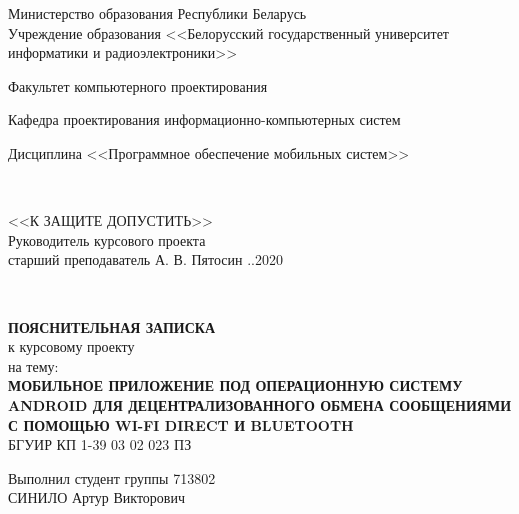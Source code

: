 
\begin{titlepage}
  \begin{center}
    Министерство образования Республики Беларусь\\
    Учреждение образования <<Белорусский государственный университет информатики и радиоэлектроники>>\\[1.15em]

    \begin{minipage}{\textwidth}
      \begin{center}
          Факультет компьютерного проектирования

          Кафедра проектирования информационно-компьютерных систем

          Дисциплина <<Программное обеспечение мобильных систем>>
      \end{center}
    \end{minipage}\\[2em]

    \begin{flushright}
      \begin{minipage}{0.5\textwidth}
	    \begin{flushleft}
          <<К ЗАЩИТЕ ДОПУСТИТЬ>>\\
          Руководитель курсового проекта\\
		  старший преподаватель
          \underline{\hspace*{2.8cm}}А. В. Пятосин
          \underline{\hspace*{2em}}.\underline{\hspace*{2em}}.2020
	    \end{flushleft}
      \end{minipage}\\[4.4em]
    \end{flushright}

	\textbf{\MakeTextUppercase{ПОЯСНИТЕЛЬНАЯ ЗАПИСКА}}\\
    {к курсовому проекту}\\
    {на тему:}\\
	\textbf{\MakeTextUppercase{Мобильное приложение под операционную систему Android для децентрализованного обмена сообщениями с помощью Wi-Fi Direct и Bluetooth}}\\[1em]

	{БГУИР КП 1-39 03 02 023 ПЗ}\\[2em]

    \begin{flushright}
      \begin{minipage}{0.5\textwidth}
        \begin{flushleft}
          Выполнил студент группы 713802\\
		  \MakeTextUppercase{Синило} Артур Викторович\\
		  \underline{\hspace*{8cm}}


\end{flushleft}
\end{minipage}
\end{flushright}
\end{center}
\end{titlepage}
